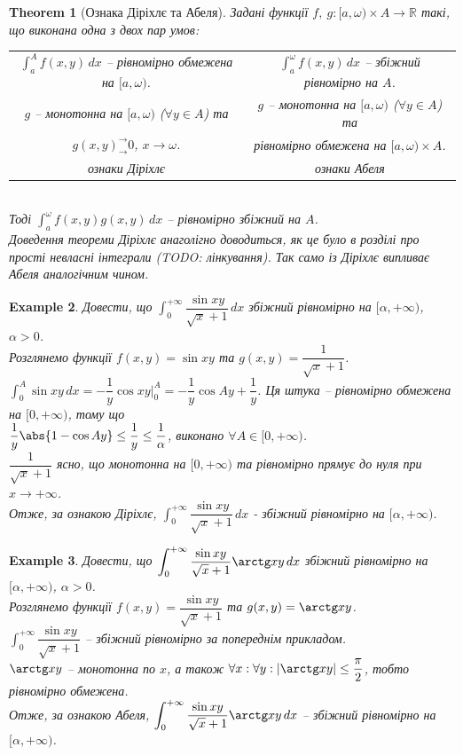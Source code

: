 \documentclass[a4paper, 10pt]{article}
\def\huge{\displaystyle}
\theoremstyle{theoremdd}
\newtheorem{theorem}{Theorem}[subsection]
\theoremstyle{theoremdd}
\theoremstyle{theoremdd}
\theoremstyle{theoremdd}
\theoremstyle{theoremdd}
\newtheorem{example}[theorem]{Example}
\theoremstyle{theoremdd}
\theoremstyle{theoremdd}
\theoremstyle{theoremdd}
\theoremstyle{theoremdd}
\begin{document}
\begin{theorem}[Ознака Діріхлє та Абеля]
Задані функції $f,\ g \colon [a,\omega) \times A \to \mathbb{R}$ такі, що виконана одна з двох пар умов:\\
 \begin{tabular}{c|c}
$\huge\int_a^A f(x,y)\,dx$ -- рівномірно обмежена на $[a,\omega)$. & $\huge\int_a^\omega f(x,y)\,dx$ -- збіжний рівномірно на $A$. \\
$g$ -- монотонна на $[a,\omega)$ ($\forall y \in A$) та  & $g$ -- монотонна на $[a,\omega)$ ($\forall y \in A$) та \\
 $g(x,y)^\rightarrow_\rightarrow 0$, $x \to \omega$. & рівномірно обмежена на $[a,\omega) \times A$. \\
\textit{ознаки Діріхлє} & \textit{ознаки Абеля}
\end{tabular}\\
Тоді $\huge \int_a^\omega f(x,y) g(x,y)\,dx$ -- рівномірно збіжний на $A$.\\
\textit{Доведення теореми Діріхлє анаголігно доводиться, як це було в розділі про прості невласні інтеграли (TODO: лінкування). Так само із Діріхлє випливає Абеля аналогічним чином.}
\end{theorem}

\begin{example}
Довести, що $\huge\int_0^{+\infty} \dfrac{\sin xy}{\sqrt{x}+1}\,dx$ збіжний рівномірно на $[\alpha,+\infty)$, $\alpha>0$.\\
Розглянемо функції $f(x,y) = \sin xy$ та $g(x,y) = \dfrac{1}{\sqrt{x}+1}$.\\
$\huge\int_0^A \sin xy\,dx = -\dfrac{1}{y} \cos xy \Big|_{0}^A = -\dfrac{1}{y} \cos Ay + \dfrac{1}{y}$. Ця штука -- рівномірно обмежена на $[0,+\infty)$, тому що\\
$\dfrac{1}{y} \abs{1 - \cos Ay} \leq \dfrac{1}{y} \leq \dfrac{1}{\alpha}$, виконано $\forall A \in [0,+\infty)$.\\
$\dfrac{1}{\sqrt{x}+1}$ ясно, що монотонна на $[0,+\infty)$ та рівномірно прямує до нуля при $x \to +\infty$.\\
Отже, за ознакою Діріхлє, $\huge\int_0^{+\infty} \dfrac{\sin xy}{\sqrt{x}+1}\,dx$ - збіжний рівномірно на $[\alpha,+\infty)$.
\end{example}

\begin{example}
Довести, що $\huge\int_0^{+\infty} \dfrac{\sin xy}{\sqrt{x}+1} \arctg xy\,dx$ збіжний рівномірно на $[\alpha,+\infty)$, $\alpha>0$.\\
Розглянемо функції $f(x,y) = \dfrac{\sin xy}{\sqrt{x}+1}$ та $g(x,y) = \arctg xy$.\\
$\huge\int_0^{+\infty} \dfrac{\sin xy}{\sqrt{x}+1}$ -- збіжний рівномірно за попереднім прикладом.\\
$\arctg xy$ -- монотонна по $x$, а також $\forall x: \forall y: |\arctg xy| \leq \dfrac{\pi}{2}$, тобто рівномірно обмежена.\\
Отже, за ознакою Абеля, $\huge\int_0^{+\infty} \dfrac{\sin xy}{\sqrt{x}+1} \arctg xy\,dx$ -- збіжний рівномірно на $[\alpha,+\infty)$.
\end{example}
\end{document}
